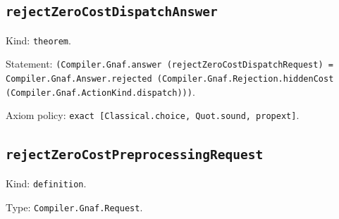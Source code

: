 \documentclass[11pt]{article}
\begin{document}
\subsection*{\texttt{rejectZeroCostDispatchAnswer}}
\noindent Kind: \texttt{theorem}.\par
\noindent Statement: \texttt{(Compiler.Gnaf.answer (rejectZeroCostDispatchRequest) = Compiler.Gnaf.Answer.rejected (Compiler.Gnaf.Rejection.hiddenCost (Compiler.Gnaf.ActionKind.dispatch)))}.\par
\noindent Axiom policy: \texttt{exact [Classical.choice, Quot.sound, propext]}.\par
\subsection*{\texttt{rejectZeroCostPreprocessingRequest}}
\noindent Kind: \texttt{definition}.\par
\noindent Type: \texttt{Compiler.Gnaf.Request}.\par
\end{document}
